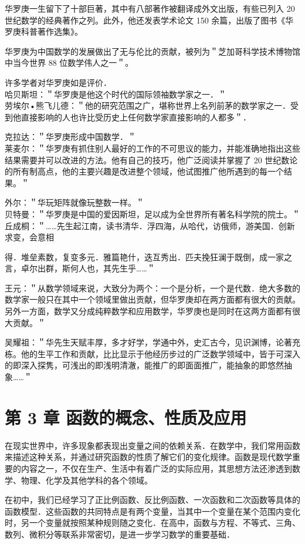 \documentclass[10pt]{article}
\begin{document}
华罗庚一生留下了十部巨著，其中有八部著作被翻译成外文出版，有些已列入 20 世纪数学的经典著作之列。此外，他还发表学术论文 150 余篇，出版了图书《华罗庚科普著作选集》。

华罗庚为中国数学的发展做出了无与伦比的贡献，被列为＂芝加哥科学技术博物馆中当今世界 88 位数学伟人之一＂。

许多学者对华罗庚如是评价．\\
哈贝斯坦：＂华罗庚是他这个时代的国际领袖数学家之一．＂\\
劳埃尔•熊飞儿德：＂他的研究范围之广，堪称世界上名列前茅的数学家之一．受到他直接影响的人也许比受历史上任何数学家直接影响的人都多＂．

克拉达：＂华罗庚形成中国数学．＂\\
莱麦尔：＂华罗庚有抓住别人最好的工作的不可思议的能力，并能准确地指出这些结果需要并可以改进的方法。他有自己的技巧，他广泛阅读并掌握了 20 世纪数论的所有制高点，他的主要兴趣是改进整个领域，他试图推广他所遇到的每一个结果。＂

外尔：＂华玩矩阵就像玩整数一样。＂\\
贝特曼：＂华罗庚是中国的爱因斯坦，足以成为全世界所有著名科学院的院士。＂\\
丘成桐：＂……先生起江南，读书清华．浮四海，从哈代，访俄师，游美国．创新求变，会意相

得．堆垒素数，复变多元．雅篇艳什，迭互秀出．匹夫挽狂澜于既倒，成一家之言，卓尔出群，斯何人也，其先生乎……＂

王元：＂从数学领域来说，大致分为两个：一个是分析，一个是代数．绝大多数的数学家一般只在其中一个领域里做出贡献，但华罗庚却在两方面都有很大的贡献。另外一方面，数学又分成纯粹数学和应用数学，华罗庚也是同时在这两方面都有很大贡献。＂

吴耀祖：＂华先生天赋丰厚，多才好学，学通中外，史汇古今，见识渊博，论著充栋。他的生平工作和贡献，比比显示于他经历步过的广泛数学领域中，皆于可深入的即深入探隽，可浅出的即浅明清澈，能推广的即面面推广，能抽象的即悠然抽象……＂

\section*{第 3 章 函数的概念、性质及应用}
在现实世界中，许多现象都表现出变量之间的依赖关系．在数学中，我们常用函数来描述这种关系，并通过研究函数的性质了解它们的变化规律。函数是现代数学重要的内容之一，不仅在生产、生活中有着广泛的实际应用，其思想方法还渗透到数学、物理、化学及其他学科的各个领域。

在初中，我们已经学习了正比例函数、反比例函数、一次函数和二次函数等具体的函数模型．这些函数的共同特点是有两个变量，当其中一个变量在某个范围内变化时，另一个变量就按照某种规则随之变化．在高中，函数与方程、不等式、三角、数列、微积分等联系非常密切，是进一步学习数学的重要基础．
\end{document}
